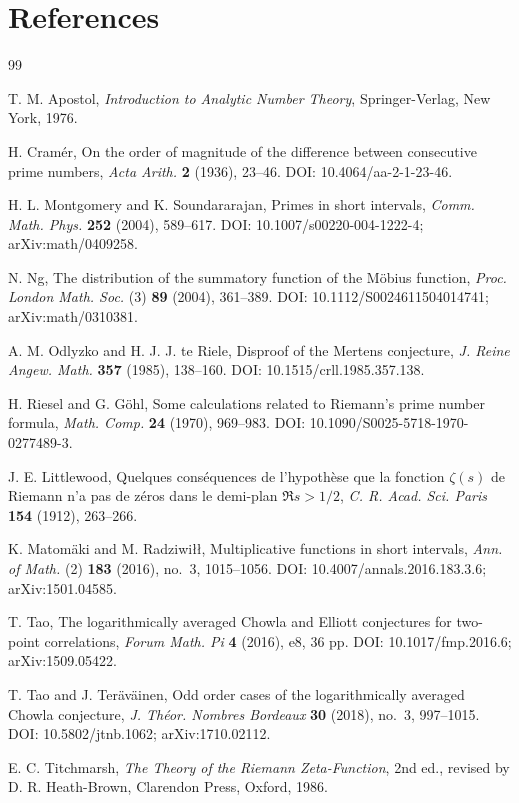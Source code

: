 \documentclass[11pt]{amsart}
\numberwithin{equation}{section}
\theoremstyle{plain}
\theoremstyle{definition}
\theoremstyle{remark}
\begin{document}
\section*{References}
\label{sec:references}
\begin{thebibliography}{99}

T. M. Apostol,
\emph{Introduction to Analytic Number Theory},
Springer-Verlag, New York, 1976.

H. Cram\'er,
On the order of magnitude of the difference between consecutive prime numbers,
\emph{Acta Arith.} \textbf{2} (1936), 23--46.
DOI: 10.4064/aa-2-1-23-46.

H. L. Montgomery and K. Soundararajan,
Primes in short intervals,
\emph{Comm. Math. Phys.} \textbf{252} (2004), 589--617.
DOI: 10.1007/s00220-004-1222-4; arXiv:math/0409258.

N. Ng,
The distribution of the summatory function of the M\"obius function,
\emph{Proc. London Math. Soc.} (3) \textbf{89} (2004), 361--389.
DOI: 10.1112/S0024611504014741; arXiv:math/0310381.

A. M. Odlyzko and H. J. J. te Riele,
Disproof of the Mertens conjecture,
\emph{J. Reine Angew. Math.} \textbf{357} (1985), 138--160.
DOI: 10.1515/crll.1985.357.138.

H. Riesel and G. G\"ohl,
Some calculations related to Riemann's prime number formula,
\emph{Math. Comp.} \textbf{24} (1970), 969--983.
DOI: 10.1090/S0025-5718-1970-0277489-3.

J. E. Littlewood,
Quelques cons\'equences de l'hypoth\`ese que la fonction $\zeta(s)$ de Riemann
n'a pas de z\'eros dans le demi-plan $\Re s>1/2$,
\emph{C. R. Acad. Sci. Paris} \textbf{154} (1912), 263--266.

K. Matom\"aki and M. Radziwi\l\l,
Multiplicative functions in short intervals,
\emph{Ann. of Math.} (2) \textbf{183} (2016), no.~3, 1015--1056.
DOI: 10.4007/annals.2016.183.3.6; arXiv:1501.04585.

T. Tao,
The logarithmically averaged Chowla and Elliott conjectures for two-point correlations,
\emph{Forum Math. Pi} \textbf{4} (2016), e8, 36 pp.
DOI: 10.1017/fmp.2016.6; arXiv:1509.05422.

T. Tao and J. Ter\"av\"ainen,
Odd order cases of the logarithmically averaged Chowla conjecture,
\emph{J. Th\'eor. Nombres Bordeaux} \textbf{30} (2018), no.~3, 997--1015.
DOI: 10.5802/jtnb.1062; arXiv:1710.02112.

E. C. Titchmarsh,
\emph{The Theory of the Riemann Zeta-Function},
2nd ed., revised by D. R. Heath-Brown, Clarendon Press, Oxford, 1986.

\end{thebibliography}
\end{document}
